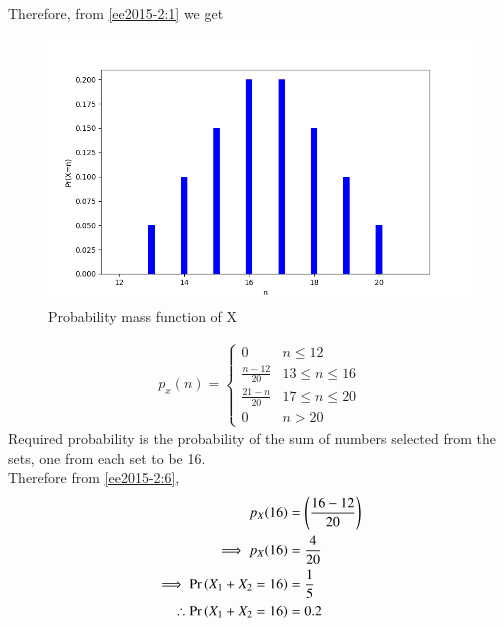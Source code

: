 Therefore, from \eqref{ee2015-2:1} we get
\begin{figure}[!hbt]
    \centering
    \includegraphics[width=\columnwidth]{solutions/ee/2015/2/Figure_1.png}
    \caption{Probability mass function of X}
    \label{ee2015-2:Figure_1}
\end{figure}
\begin{align}
    p_x(n) = 
    \begin{cases}
    0 & n \leq 12\\
    \frac{n-12}{20}  & 13 \leq n \leq 16\\
    \frac{21-n}{20}  & 17 \leq n \leq 20\\
    0 & n>20
    \end{cases}\label{ee2015-2:6}
\end{align}
Required probability is the probability of the sum of numbers selected from the sets, one from each set to be 16.\\
Therefore from \eqref{ee2015-2:6},
\begin{align}
    p_X(16) &= \left(\frac{16-12}{20}\right)\\
    \implies p_X(16) &= \frac{4}{20}\\
    \implies\Pr\left(X_1+X_2=16\right) &= \frac{1}{5} \\
    \therefore \Pr\left(X_1+X_2=16\right)  &= 0.2
\end{align}
